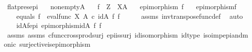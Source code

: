 \begin{isabellebody}
\isanewline
{}\isamarkupfalse%
%
\endisatagproof
{\isafoldproof}%
%
\isadelimproof
\isanewline
%
\endisadelimproof
\isanewline
{}\isamarkupfalse%
\ flat{\isacharunderscore}{\kern0pt}pres{\isacharunderscore}{\kern0pt}epi{\isacharcolon}{\kern0pt}\isanewline
\ \ \ {\isachardoublequoteopen}nonempty{\isacharparenleft}{\kern0pt}A{\isacharparenright}{\kern0pt}{\isachardoublequoteclose}\isanewline
\ \ \ {\isachardoublequoteopen}f\ {\isacharcolon}{\kern0pt}\ Z\ {\isasymrightarrow}\ X\isactrlbsup A\isactrlesup {\isachardoublequoteclose}\isanewline
\ \ \ {\isachardoublequoteopen}epimorphism\ f{\isachardoublequoteclose}\isanewline
\ \ \ {\isachardoublequoteopen}epimorphism{\isacharparenleft}{\kern0pt}f\isactrlsup {\isasymflat}{\isacharparenright}{\kern0pt}{\isachardoublequoteclose}\isanewline
%
\isadelimproof
%
\endisadelimproof
%
\isatagproof
{}\isamarkupfalse%
\ {\isacharminus}{\kern0pt}\ \isanewline
\ \ \isamarkupfalse%
\ equals{\isacharcolon}{\kern0pt}\ {\isachardoublequoteopen}f\isactrlsup {\isasymflat}\ {\isacharequal}{\kern0pt}\ {\isacharparenleft}{\kern0pt}eval{\isacharunderscore}{\kern0pt}func\ X\ A{\isacharparenright}{\kern0pt}\ {\isasymcirc}\isactrlsub c\ {\isacharparenleft}{\kern0pt}id{\isacharparenleft}{\kern0pt}A{\isacharparenright}{\kern0pt}\ {\isasymtimes}\isactrlsub f\ f{\isacharparenright}{\kern0pt}{\isachardoublequoteclose}\isanewline
\ \ \ \ \isamarkupfalse%
\ assms{\isacharparenleft}{\kern0pt}{}{\isacharparenright}{\kern0pt}\ inv{\isacharunderscore}{\kern0pt}transpose{\isacharunderscore}{\kern0pt}func{\isacharunderscore}{\kern0pt}def{}\ \isamarkupfalse%
\ auto\isanewline
\ \ \isamarkupfalse%
\ idA{\isacharunderscore}{\kern0pt}f{\isacharunderscore}{\kern0pt}epi{\isacharcolon}{\kern0pt}\ {\isachardoublequoteopen}epimorphism{\isacharparenleft}{\kern0pt}{\isacharparenleft}{\kern0pt}id{\isacharparenleft}{\kern0pt}A{\isacharparenright}{\kern0pt}\ {\isasymtimes}\isactrlsub f\ f{\isacharparenright}{\kern0pt}{\isacharparenright}{\kern0pt}{\isachardoublequoteclose}\isanewline
\ \ \ \ \isamarkupfalse%
\ assms{\isacharparenleft}{\kern0pt}{}{\isacharparenright}{\kern0pt}\ assms{\isacharparenleft}{\kern0pt}{}{\isacharparenright}{\kern0pt}\ cfunc{\isacharunderscore}{\kern0pt}cross{\isacharunderscore}{\kern0pt}prod{\isacharunderscore}{\kern0pt}surj\ epi{\isacharunderscore}{\kern0pt}is{\isacharunderscore}{\kern0pt}surj\ id{\isacharunderscore}{\kern0pt}isomorphism\ id{\isacharunderscore}{\kern0pt}type\ iso{\isacharunderscore}{\kern0pt}imp{\isacharunderscore}{\kern0pt}epi{\isacharunderscore}{\kern0pt}and{\isacharunderscore}{\kern0pt}monic\ surjective{\isacharunderscore}{\kern0pt}is{\isacharunderscore}{\kern0pt}epimorphism\ \isamarkupfalse%

\end{isabellebody}
